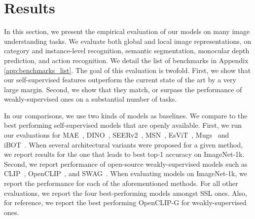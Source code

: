 \section{Results}

\label{sec:results}
In this section, we present the empirical evaluation of our models on many image understanding tasks.
We evaluate both global and local image representations, on category and instance-level recognition, semantic segmentation, monocular depth prediction, and action recognition. 
We detail the list of benchmarks in Appendix \ref{app:benchmarks_list}.
The goal of this evaluation is twofold.
First, we show that our self-supervised features outperform the current state of the art by a very large margin.
Second, we show that they match, or surpass the performance of weakly-supervised ones on a substantial number of tasks.


In our comparisons, we use two kinds of models as baselines.
We compare to the best performing self-supervised models that are openly available.
First, we run our evaluations for MAE~\citep{he2021masked}, DINO~\citep{caron2021emerging}, SEERv2~\citep{goyal2022vision}, MSN~\citep{assran2022masked}, EsViT~\citep{li2021efficient}, Mugs~\citep{zhou2022mugs} and iBOT~\citep{zhou2021ibot}.
When several architectural variants were proposed for a given method, we report results for the one that leads to best top-1 accuracy on ImageNet-1k.
Second, we report performance of open-source weakly-supervised models such as CLIP~\citep{radford2021learning}, OpenCLIP~\citep{ilharco_gabriel_2021_5143773, cherti2023reproducible}, and SWAG~\citep{singh2022revisiting}.
When evaluating models on ImageNet-1k, we report the performance for each of the aforementioned methods. 
For all other evaluations, we report the four best-performing models amongst SSL ones.
Also, for reference, we report the best performing OpenCLIP-G for weakly-supervised ones.

